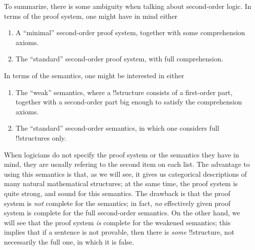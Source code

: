 \documentclass[../../include/open-logic-section]{subfiles}
\begin{document}
To summarize, there is some ambiguity when talking about second-order
logic. In terms of the proof system, one might have in mind either
\begin{enumerate}
\item A ``minimal'' second-order proof system, together with some
  comprehension axioms.
\item The ``standard'' second-order proof system, with full
  comprehension.
\end{enumerate}
In terms of the semantics, one might be interested in either
\begin{enumerate}
\item The ``weak'' semantics, where a !!{structure} consists of a first-order
  part, together with a second-order part big enough to satisfy the
  comprehension axioms.
\item The ``standard'' second-order semantics, in which one considers
  full !!{structure}s only.
\end{enumerate}
When logicians do not specify the proof system or the semantics they
have in mind, they are usually refering to the second item on each
list. The advantage to using this semantics is that, as we will see,
it gives us categorical descriptions of many natural mathematical
structures; at the same time, the proof system is quite strong, and
sound for this semantics. The drawback is that the proof system is
\emph{not} complete for the semantics; in fact, \emph{no} effectively
given proof system is complete for the full second-order semantics. On
the other hand, we will see that the proof system \emph{is} complete
for the weakened semantics; this implies that if a sentence is not
provable, then there is \emph{some} !!{structure}, not necessarily the
full one, in which it is false.
\end{document}
